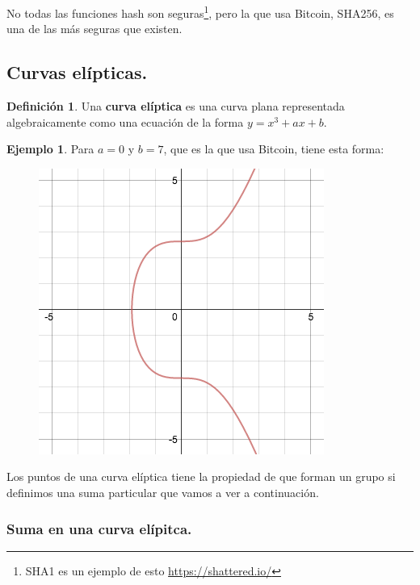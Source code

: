 \documentclass[twoside]{article}
\theoremstyle{definition}
\newtheorem{defi}[teorema]{Definición}
\newtheorem{ej}[teorema]{Ejemplo}
\begin{document}
No todas las funciones hash son seguras\footnote{SHA1 es un ejemplo de esto \url{https://shattered.io/}}, pero la que usa Bitcoin, SHA256, es una de las más seguras que existen.

\newpage

\subsection{Curvas elípticas.}
\begin{defi}
Una \textbf{curva elíptica} es una curva plana representada algebraicamente como una ecuación de la forma $y=x^3+ax+b$. 
\end{defi}

\begin{ej} Para $a=0$ y $b=7$, que es la que usa Bitcoin, tiene esta forma:
\begin{figure}[h!]
\includegraphics[scale=0.42]{ec}
\end{figure}
\end{ej}

Los puntos de una curva elíptica tiene la propiedad de que forman un grupo si definimos una suma particular que vamos a ver a continuación. 

\subsubsection{Suma en una curva elípitca.}
\end{document}
